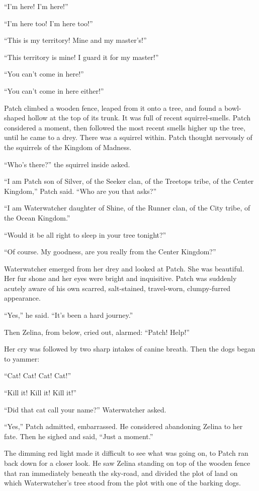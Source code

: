 \documentclass[12pt]{memoir}
\begin{document}
“I’m here! I’m here!”

“I’m here too! I’m here too!”

“This is my territory! Mine and my master’s!”

“This territory is mine! I guard it for my master!”

“You can’t come in here!”

“You can’t come in here either!”

Patch climbed a wooden fence, leaped from it onto a tree, and found a
bowl-shaped hollow at the top of its trunk. It was full of recent
squirrel-smells. Patch considered a moment, then followed the most
recent smells higher up the tree, until he came to a drey. There was a
squirrel within. Patch thought nervously of the squirrels of the
Kingdom of Madness.

“Who’s there?” the squirrel inside asked.

“I am Patch son of Silver, of the Seeker clan, of the Treetops tribe,
of the Center Kingdom,” Patch said. “Who are you that asks?”

“I am Waterwatcher daughter of Shine, of the Runner clan, of the City
tribe, of the Ocean Kingdom.”

“Would it be all right to sleep in your tree tonight?”

“Of course. My goodness, are you really from the Center Kingdom?”

Waterwatcher emerged from her drey and looked at Patch. She was
beautiful. Her fur shone and her eyes were bright and
inquisitive. Patch was suddenly acutely aware of his own scarred,
salt-stained, travel-worn, clumpy-furred appearance.

“Yes,” he said. “It’s been a hard journey.”

Then Zelina, from below, cried out, alarmed: “Patch! Help!”

Her cry was followed by two sharp intakes of canine breath. Then the
dogs began to yammer:

“Cat! Cat! Cat! Cat!”

“Kill it! Kill it! Kill it!”

“Did that cat call your name?” Waterwatcher asked.

“Yes,” Patch admitted, embarrassed. He considered abandoning Zelina to
her fate. Then he sighed and said, “Just a moment.”

The dimming red light made it difficult to see what was going on, to
Patch ran back down for a closer look. He saw Zelina standing on top
of the wooden fence that ran immediately beneath the sky-road, and
divided the plot of land on which Waterwatcher’s tree stood from the
plot with one of the barking dogs.
\end{document}
